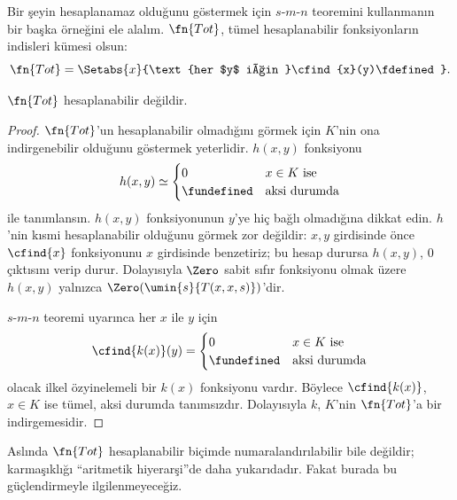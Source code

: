 \documentclass[../../../include/open-logic-section]{subfiles}
\begin{document}

Bir şeyin hesaplanamaz olduğunu göstermek için $s$-$m$-$n$ teoremini
kullanmanın bir başka örneğini ele alalım. $\fn{Tot}$, tümel hesaplanabilir
fonksiyonların indisleri kümesi olsun:
\[
  \fn{Tot}=\Setabs{x}{\text{her $y$ için }\cfind{x}(y)\fdefined}.
\]

\begin{prop}
$\fn{Tot}$ hesaplanabilir değildir.
\end{prop}

\begin{proof}
$\fn{Tot}$'un hesaplanabilir olmadığını görmek için $K$'nin ona
indirgenebilir olduğunu göstermek yeterlidir. $h(x,y)$ fonksiyonu
\[
  h(x,y)\simeq\begin{cases}
    0 & \text{$x\in K$ ise}\\
    \fundefined & \text{aksi durumda}
  \end{cases}
\]
ile tanımlansın. $h(x,y)$ fonksiyonunun $y$'ye hiç bağlı olmadığına dikkat
edin. $h$'nin kısmi hesaplanabilir olduğunu görmek zor değildir: $x,y$
girdisinde önce $\cfind{x}$ fonksiyonunu $x$ girdisinde benzetiriz; bu hesap
durursa $h(x,y)$, $0$ çıktısını verip durur. Dolayısıyla $\Zero$ sabit sıfır
fonksiyonu olmak üzere $h(x,y)$ yalnızca
$\Zero(\umin{s}{T(x,x,s)})$'dir.

$s$-$m$-$n$ teoremi uyarınca her $x$ ile $y$ için
\[
  \cfind{k(x)}(y)=\begin{cases}
    0 & \text{$x\in K$ ise}\\
    \fundefined & \text{aksi durumda}
  \end{cases}
\]
olacak ilkel özyinelemeli bir $k(x)$ fonksiyonu vardır. Böylece
$\cfind{k(x)}$, $x\in K$ ise tümel, aksi durumda tanımsızdır. Dolayısıyla
$k$, $K$'nin $\fn{Tot}$'a bir indirgemesidir.
\end{proof}

\begin{digress}
Aslında $\fn{Tot}$ hesaplanabilir biçimde numaralandırılabilir bile değildir;
karmaşıklığı ``aritmetik hiyerarşi''de daha yukarıdadır. Fakat burada bu
güçlendirmeyle ilgilenmeyeceğiz.
\end{digress}
\end{document}
